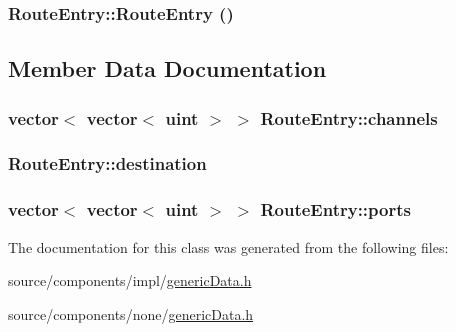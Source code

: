 \hypertarget{classRouteEntry_2823cc34016bfd3b831ca8a9e15d19af}{
\subsubsection[{RouteEntry}]{\setlength{\rightskip}{0pt plus 5cm}RouteEntry::RouteEntry ()}}
\label{classRouteEntry_2823cc34016bfd3b831ca8a9e15d19af}




\subsection{Member Data Documentation}
\hypertarget{classRouteEntry_932298835da30e9e91f005a4566c8932}{
\subsubsection[{channels}]{\setlength{\rightskip}{0pt plus 5cm}vector$<$ vector$<$ {\bf uint} $>$ $>$ {\bf RouteEntry::channels}}}
\label{classRouteEntry_932298835da30e9e91f005a4566c8932}


\hypertarget{classRouteEntry_470e2ba2804fa9bc03f346c6affbc81b}{
\subsubsection[{destination}]{ {\bf RouteEntry::destination}}}
\label{classRouteEntry_470e2ba2804fa9bc03f346c6affbc81b}


\hypertarget{classRouteEntry_76532598e6bfd96c82faca9e5bc216a5}{
\subsubsection[{ports}]{\setlength{\rightskip}{0pt plus 5cm}vector$<$ vector$<$ {\bf uint} $>$ $>$ {\bf RouteEntry::ports}}}
\label{classRouteEntry_76532598e6bfd96c82faca9e5bc216a5}




The documentation for this class was generated from the following files:\begin{CompactItemize}
\item 
source/components/impl/\hyperlink{impl_2genericData_8h}{genericData.h}\item 
source/components/none/\hyperlink{none_2genericData_8h}{genericData.h}\end{CompactItemize}
